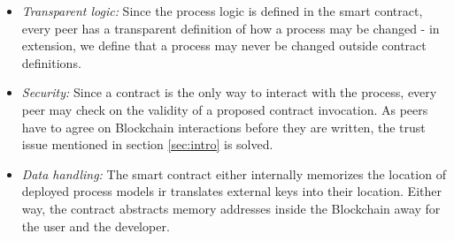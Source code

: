 \begin{itemize}
    \item \emph{Transparent logic:} Since the process logic is defined in the smart contract, every peer has a transparent definition of how a process may be changed - in extension, we define that a process may never be changed outside contract definitions.
    \item \emph{Security:} Since a contract is the only way to interact with the process, every peer may check on the validity of a proposed contract invocation. As peers have to agree on Blockchain interactions before they are written, the trust issue mentioned in section \ref{sec:intro} is solved.
    \item \emph{Data handling:} The smart contract either internally memorizes the location of deployed process models ir translates external keys into their location. Either way, the contract abstracts memory addresses inside the Blockchain away for the user and the developer.
\end{itemize}